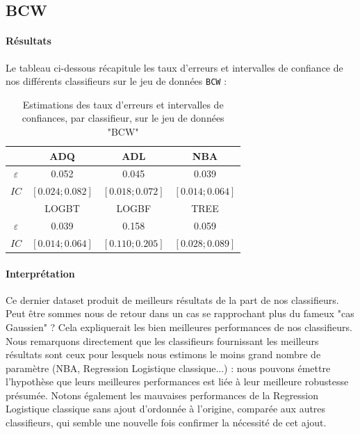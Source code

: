 \documentclass{report}
\begin{document}
\newpage
\subsection{BCW}
\paragraph{Résultats}
Le tableau ci-dessous récapitule les taux d'erreurs et intervalles de confiance de nos différents classifieurs sur le jeu de données \verb+BCW+ :

\begin{table}[h!]
    \centering
    \caption{Estimations des taux d'erreurs et intervalles de confiances, par classifieur, sur le jeu de données "BCW"}
    \label{tab:table1}
    \def\arraystretch{1.5}
    \begin{tabular}{c||c|c|c}
        \hline
        & ADQ & ADL & NBA\\
        \hline
        $\varepsilon$ & 0.052 & 0.045 & 0.039\\
        \hline
        $IC$ & $[0.024 ; 0.082]$ & $[0.018; 0.072]$ & $[0.014 ; 0.064]$\\
        \hline
        \hline
        & LOGBT & LOGBF & TREE\\
        \hline
        $\varepsilon$ & 0.039 & 0.158
        & 0.059\\
        \hline
        $IC$ & $[0.014 ; 0.064]$ & $[0.110 ; 0.205]$
        & $[0.028 ; 0.089]$\\
        \hline
        \hline
    \end{tabular}
\end{table}

\paragraph{Interprétation}
Ce dernier dataset produit de meilleurs résultats de la part de nos classifieurs. Peut être sommes nous de retour dans un cas se rapprochant plus du fameux "cas Gaussien" ? Cela expliquerait les bien meilleures performances de nos classifieurs. Nous remarquons directement que les classifieurs fournissant les meilleurs résultats sont ceux pour lesquels nous estimons le moins grand nombre de paramètre (NBA, Regression Logistique classique...) : nous pouvons émettre l'hypothèse que leurs meilleures performances est liée à leur meilleure robustesse présumée. Notons également les mauvaises performances de la Regression Logistique classique sans ajout d'ordonnée à l'origine, comparée aux autres classifieurs, qui semble une nouvelle fois confirmer la nécessité de cet ajout.
\end{document}
